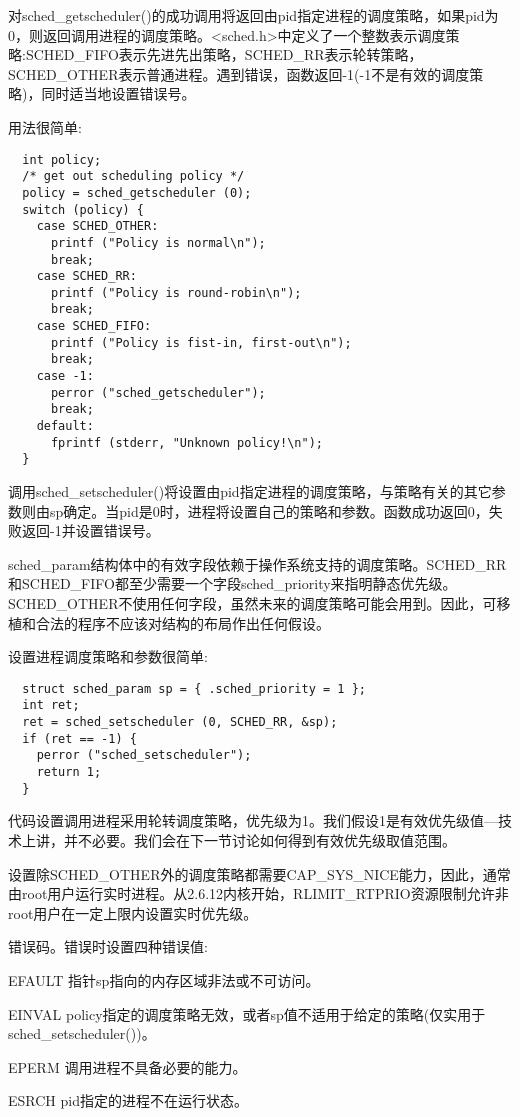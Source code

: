   对sched\_getscheduler()的成功调用将返回由pid指定进程的调度策略，如果pid为0，则返回调用进程的调度策略。<sched.h>中定义了一个整数表示调度策略:SCHED\_FIFO表示先进先出策略，SCHED\_RR表示轮转策略，SCHED\_OTHER表示普通进程。遇到错误，函数返回-1(-1不是有效的调度策略)，同时适当地设置错误号。

  用法很简单:

\begin{lstlisting}
  int policy;
  /* get out scheduling policy */
  policy = sched_getscheduler (0);
  switch (policy) {
    case SCHED_OTHER:
      printf ("Policy is normal\n");
      break;
    case SCHED_RR:
      printf ("Policy is round-robin\n");
      break;
    case SCHED_FIFO:
      printf ("Policy is fist-in, first-out\n");
      break;
    case -1:
      perror ("sched_getscheduler");
      break;
    default:
      fprintf (stderr, "Unknown policy!\n");
  }
\end{lstlisting}

  调用sched\_setscheduler()将设置由pid指定进程的调度策略，与策略有关的其它参数则由sp确定。当pid是0时，进程将设置自己的策略和参数。函数成功返回0，失败返回-1并设置错误号。

  sched\_param结构体中的有效字段依赖于操作系统支持的调度策略。SCHED\_RR和SCHED\_FIFO都至少需要一个字段sched\_priority来指明静态优先级。SCHED\_OTHER不使用任何字段，虽然未来的调度策略可能会用到。因此，可移植和合法的程序不应该对结构的布局作出任何假设。

  设置进程调度策略和参数很简单:

\begin{lstlisting}
  struct sched_param sp = { .sched_priority = 1 };
  int ret;
  ret = sched_setscheduler (0, SCHED_RR, &sp);
  if (ret == -1) {
    perror ("sched_setscheduler");
    return 1;
  }
\end{lstlisting}

  代码设置调用进程采用轮转调度策略，优先级为1。我们假设1是有效优先级值---技术上讲，并不必要。我们会在下一节讨论如何得到有效优先级取值范围。

  设置除SCHED\_OTHER外的调度策略都需要CAP\_SYS\_NICE能力，因此，通常由root用户运行实时进程。从2.6.12内核开始，RLIMIT\_RTPRIO资源限制允许非root用户在一定上限内设置实时优先级。

  错误码。错误时设置四种错误值:

\begin{eqlist*}
\item[EFAULT] 指针sp指向的内存区域非法或不可访问。
\item[EINVAL] policy指定的调度策略无效，或者sp值不适用于给定的策略(仅实用于sched\_setscheduler())。
\item[EPERM] 调用进程不具备必要的能力。
\item[ESRCH] pid指定的进程不在运行状态。
\end{eqlist*}


